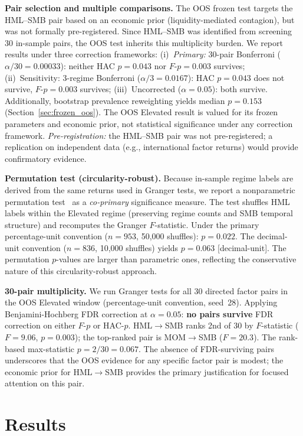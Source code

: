 \documentclass[sigconf,anonymous]{acmart}
\begin{document}
\textbf{Pair selection and multiple comparisons.} The OOS frozen test targets
the HML--SMB pair based on an economic prior (liquidity-mediated contagion),
but was not formally pre-registered. Since HML--SMB was identified from screening
30 in-sample pairs, the OOS test inherits this multiplicity burden.
We report results under three correction frameworks:
(i)~\emph{Primary:} 30-pair Bonferroni ($\alpha/30 = 0.00033$): neither HAC $p = 0.043$
nor $F$-$p = 0.003$ survives;
(ii)~Sensitivity: 3-regime Bonferroni ($\alpha/3 = 0.0167$): HAC $p = 0.043$
does not survive, $F$-$p = 0.003$ survives;
(iii)~Uncorrected ($\alpha = 0.05$): both survive.
Additionally, bootstrap prevalence reweighting
yields median $p = 0.153$ (Section~\ref{sec:frozen_oos}).
The OOS Elevated result is valued for its frozen parameters and
economic prior, not statistical significance under any correction framework.
\emph{Pre-registration:} the HML--SMB pair was not pre-registered;
a replication on independent data (e.g., international factor
returns) would provide confirmatory evidence.

\textbf{Permutation test (circularity-robust).} Because in-sample regime labels
are derived from the same returns used in Granger tests, we report a
nonparametric permutation test~\cite{good2005permutation} as a
\emph{co-primary} significance measure. The test shuffles HML labels within
the Elevated regime (preserving regime counts and SMB temporal structure)
and recomputes the Granger $F$-statistic.
Under the primary percentage-unit convention ($n = 953$,
50{,}000 shuffles): $p = 0.022$. The decimal-unit convention
($n = 836$, 10{,}000 shuffles) yields $p = 0.063$ [decimal-unit].
The permutation $p$-values are larger than parametric ones, reflecting
the conservative nature of this circularity-robust approach.

\textbf{30-pair multiplicity.} We run Granger tests for all 30 directed factor pairs
in the OOS Elevated window (percentage-unit convention, seed~28).
Applying Benjamini-Hochberg FDR correction at $\alpha = 0.05$:
\textbf{no pairs survive} FDR correction on either $F$-$p$ or HAC-$p$.
HML$\to$SMB ranks 2nd of 30 by $F$-statistic
($F = 9.06$, $p = 0.003$); the top-ranked pair is MOM$\to$SMB ($F = 20.3$).
The rank-based max-statistic $p = 2/30 = 0.067$.
The absence of FDR-surviving pairs underscores that the OOS evidence for any
specific factor pair is modest; the economic prior for HML$\to$SMB provides the
primary justification for focused attention on this pair.

\section{Results}
\end{document}
